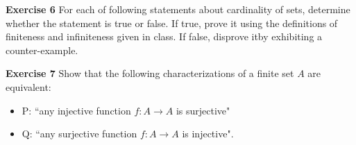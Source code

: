 \documentclass[12pt,oneside]{exam}
\newenvironment{exercise}[1]{\vspace{.1in}\noindent\textbf{Exercise #1 \hspace{.05em}}}{}
\newcommand{\func}[3]{{#1} : {#2} \longrightarrow {#3}}
\begin{document}
\begin{exercise}{6}
For each of following statements about cardinality of sets, determine whether the statement is true or false. If true, prove it using the definitions of finiteness and infiniteness given in class. If false, disprove itby exhibiting a counter-example.
\end{exercise}

\begin{exercise}{7}
Show that the following characterizations of a finite set $A$ are equivalent:
\begin{itemize}
\item P: ``any injective function $\func{f}{A}{A}$ is surjective"
\item Q: ``any surjective function $\func{f}{A}{A}$ is injective".
\end{itemize}
\end{exercise}
\end{document}
